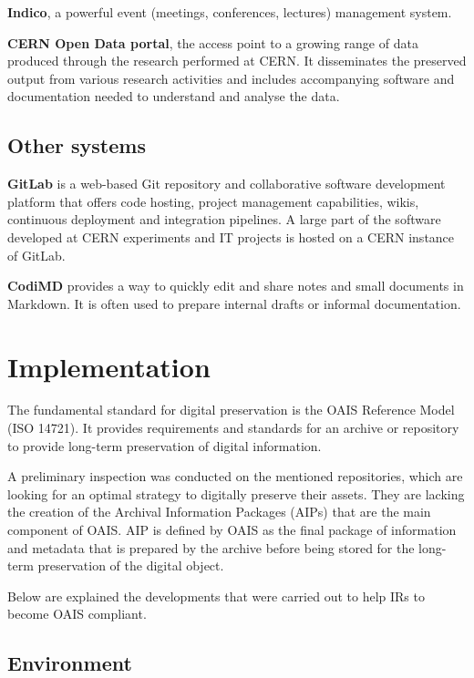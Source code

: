 \documentclass[11pt]{IEEEtran}
\begin{document}
\textbf{Indico}, a powerful event (meetings, conferences, lectures) management system.

\textbf{CERN Open Data portal}, the access point to a growing range of data produced through the research performed at CERN. It disseminates the preserved output from various research activities and includes accompanying software and documentation needed to understand and analyse the data.

\subsection{Other systems}


\textbf{GitLab} is a web-based Git repository and collaborative software development platform that offers code hosting, project management capabilities, wikis, continuous deployment and integration pipelines. A large part of the software developed at CERN experiments and IT projects is hosted on a CERN instance of GitLab.

\textbf{CodiMD} provides a way to quickly edit and share notes and small documents in Markdown. It is often used to prepare internal drafts or informal documentation.


\section{Implementation}

The fundamental standard for digital preservation is the OAIS Reference Model\cite{OAIS2002} (ISO 14721). It provides requirements and standards for an archive or repository to provide long-term preservation of digital information.

A preliminary inspection was conducted on the mentioned repositories, which are looking for an optimal strategy to digitally preserve their assets. They are lacking the creation of the Archival Information Packages (AIPs) that are the main component of OAIS. AIP is defined by OAIS as the final package of information and metadata that is prepared by the archive before being stored for the long-term preservation of the digital object.

Below are explained the developments that were carried out to help IRs to become OAIS compliant.

\subsection{Environment}
\end{document}
